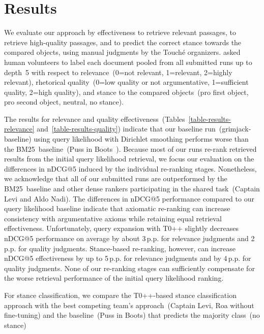 \section{Results}
\label{results}

We evaluate our approach by effectiveness to retrieve relevant passages, to retrieve high-quality passages, and to predict the correct stance towards the compared objects, using manual judgments by the Touché organizers. \citet{BondarenkoFKSGBPBSWPH2022} asked human volunteers to label each document pooled from all submitted runs up to depth~5 with respect to relevance~(0=not relevant, 1=relevant, 2=highly relevant), rhetorical quality~(0=low quality or not argumentative, 1=sufficient quality, 2=high quality), and stance to the compared objects~(pro first object, pro second object, neutral, no stance).



The results for relevance and quality effectiveness~(Tables~\ref{table-results-relevance} and~\ref{table-results-quality}) indicate that our baseline run~(grimjack-baseline) using query likelihood with Dirichlet smoothing performs worse than the BM25~baseline~(Puss in Boots~\cite{BondarenkoFKSGBPBSWPH2022}). Because most of our runs re-rank retrieved results from the initial query likelihood retrieval, we focus our evaluation on the differences in nDCG@5 induced by the individual re-ranking stages. Nonetheless, we acknowledge that all of our submitted runs are outperformed by the BM25~baseline and other dense rankers participating in the shared task~(Captain Levi and Aldo Nadi).
The differences in nDCG@5 performance compared to our query likelihood baseline indicate that axiomatic re-ranking can increase consistency with argumentative axioms while retaining equal retrieval effectiveness. Unfortunately, query expansion with T0++ slightly decreases nDCG@5 performance on average by about 3\,p.p. for relevance judgments and 2\,p.p. for quality judgments. Stance-based re-ranking, however, can increase nDCG@5 effectiveness by up to 5\,p.p. for relevance judgments and by 4\,p.p. for quality judgments. None of our re-ranking stages can sufficiently compensate for the worse retrieval performance of the initial query likelihood ranking.


For stance classification, we compare the T0++-based stance classification approach with the best competing team's approach~(Captain Levi, Ro\Bert{}a without fine-tuning) and the baseline~(Puss in Boots) that predicts the majority class~(no stance)

